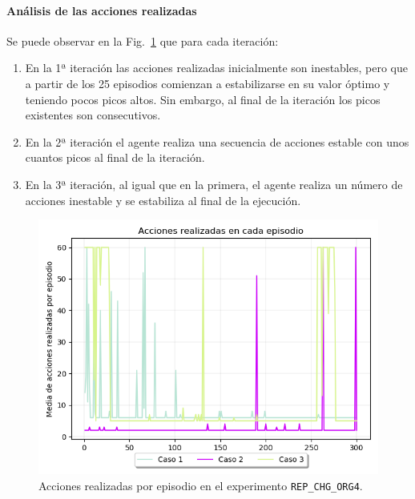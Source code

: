 \paragraph{Análisis de las acciones realizadas}

Se puede observar en la Fig.~\ref{fig:CHANGE_ORIGIN-20_09-00_57-2, 0, 1_acciones} que para cada iteración: 
\begin{enumerate}
    \item En la 1ª iteración las acciones realizadas inicialmente son inestables, pero que a partir de los 25 episodios comienzan a estabilizarse en su valor óptimo y teniendo pocos picos altos. Sin embargo, al final de la iteración los picos existentes son consecutivos. 
    \item En la 2ª iteración el agente realiza una secuencia de acciones estable con unos cuantos picos al final de la iteración. 
    \item En la 3ª iteración, al igual que en la primera, el agente realiza un número de acciones inestable y se estabiliza al final de la ejecución.
\end{enumerate}

\begin{figure}
    \centering
    \includegraphics[scale=0.4]{cap5_experimentacion/images/CHANGE_ORIGIN-20_09-00_57-2, 0, 1_acciones.png}
    \caption{Acciones realizadas por episodio en el experimento \texttt{REP\_CHG\_ORG4}.}
    \label{fig:CHANGE_ORIGIN-20_09-00_57-2, 0, 1_acciones}
\end{figure}

